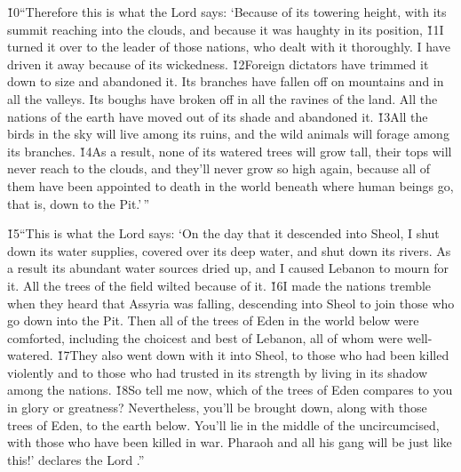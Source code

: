 \v{10}``Therefore this is what the Lord  says: `Because of its towering height, with its summit reaching into the clouds, and because it was haughty in its position, \v{11}I turned it over to the leader of those nations, who dealt with it thoroughly. I have driven it away because of its wickedness. \v{12}Foreign dictators have trimmed it down to size and abandoned it. Its branches have fallen off on mountains and in all the valleys. Its boughs have broken off in all the ravines of the land. All the nations of the earth have moved out of its shade and abandoned it. \v{13}All the birds in the sky will live among its ruins, and the wild animals will forage among its branches. \v{14}As a result, none of its watered trees will grow tall, their tops will never reach to the clouds, and they'll never grow so high again, because all of them have been appointed to death in the world beneath where human beings go, that is, down to the Pit.'\,''

\v{15}``This is what the Lord  says: `On the day that it descended into Sheol, I shut down its water supplies, covered over its deep water, and shut down its rivers. As a result its abundant water sources dried up, and I caused Lebanon to mourn for it. All the trees of the field wilted because of it. \v{16}I made the nations tremble when they heard that Assyria was falling, descending into Sheol to join those who go down into the Pit. Then all of the trees of Eden in the world below were comforted, including the choicest and best of Lebanon, all of whom were well-watered. \v{17}They also went down with it into Sheol, to those who had been killed violently and to those who had trusted in its strength by living in its shadow among the nations. \v{18}So tell me now, which of the trees of Eden compares to you in glory or greatness? Nevertheless, you'll be brought down, along with those trees of Eden, to the earth below. You'll lie in the middle of the uncircumcised, with those who have been killed in war. Pharaoh and all his gang will be just like this!' declares the Lord .''

